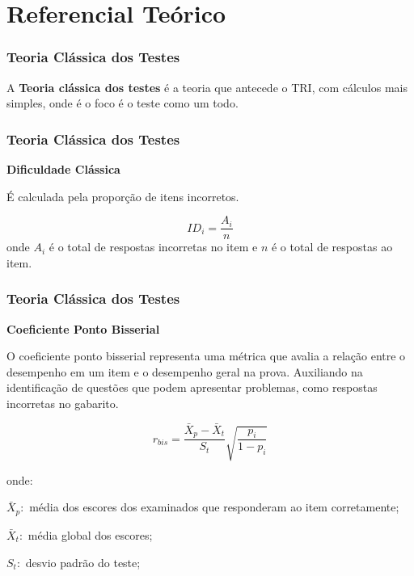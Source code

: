 \documentclass{beamer}
\begin{document}
	
	\section{Referencial Teórico}
	

	\begin{frame}
		
		\frametitle{Teoria Clássica dos Testes}
		
		A \textbf{Teoria clássica dos testes} é a teoria que antecede o TRI, 
		com cálculos mais simples, onde é o foco é o teste como um todo.
		
	\end{frame}		
	
	\begin{frame}
		
		\frametitle{Teoria Clássica dos Testes}
		
		\begin{center}
			\textbf{Dificuldade Clássica}
		\end{center}
		
		É calculada pela proporção de itens incorretos.
		
		\[
		ID_i =\dfrac{A_i}{n} 
		\]
		onde $A_i$ é o total de respostas incorretas no item e $n$ é o total de respostas ao item. 
		
	\end{frame}	
	
	\begin{frame}
		
		\frametitle{Teoria Clássica dos Testes}
		\begin{center}
			\textbf{Coeficiente Ponto Bisserial}
		\end{center}
		O coeficiente ponto bisserial representa uma métrica que avalia a relação entre o desempenho em um item e o desempenho geral na prova.
		Auxiliando na identificação de questões que podem apresentar problemas, como respostas incorretas no gabarito.
		
		\[
		r_{bis} = \frac{\bar{X}_p - \bar{X}_t}{S_t}
		\sqrt{\frac{p_i}{1 - p_i}}
		\]
		
		
		onde:
		
		
		$ \bar{X}_p :$ média dos escores dos examinados que responderam ao item corretamente;
		
		$ \bar{X}_t :$  média global dos escores;
		
		$ S_t :$  desvio padrão do teste;
	\end{frame}
	
\end{document}
